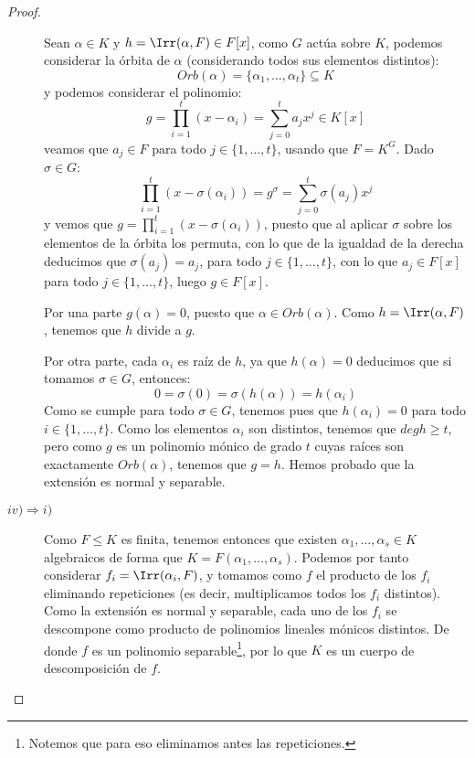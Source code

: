 \begin{teo}
\begin{proof}
\begin{description}
                Sean $\alpha\in K$ y $h = \Irr(\alpha,F)\in F[x]$, como $G$ actúa sobre $K$, podemos considerar la órbita de $\alpha$ (considerando todos sus elementos distintos):
                \begin{equation*}
                    Orb(\alpha) = \{\alpha_1, \ldots, \alpha_t\} \subseteq K
                \end{equation*}
                y podemos considerar el polinomio:
                \begin{equation*}
                    g = \prod_{i=1}^{t}(x-\alpha_i) = \sum_{j=0}^{t} a_j x^j \in K[x]
                \end{equation*}
                veamos que $a_j \in F$ para todo $j\in \{1,\ldots,t\}$, usando que $F=K^G$. Dado $\sigma\in G$:
                \begin{equation*}
                    \prod_{i=1}^{t} (x-\sigma(\alpha_i)) = g^\sigma = \sum_{j=0}^{t} \sigma(a_j) x^j
                \end{equation*}
                y vemos que $g = \prod\limits_{i=1}^{t}(x-\sigma(\alpha_i))$, puesto que al aplicar $\sigma$ sobre los elementos de la órbita los permuta, con lo que de la igualdad de la derecha deducimos que $\sigma(a_j) = a_j$, para todo $j\in \{1,\ldots,t\}$, con lo que $a_j\in F[x]$ para todo $j \in \{1,\ldots,t\}$, luego $g\in F[x]$.

                Por una parte $g(\alpha) = 0$, puesto que $\alpha\in Orb(\alpha)$. Como $h=\Irr(\alpha,F)$, tenemos que $h$ divide a $g$.

                Por otra parte, cada $\alpha_i$ es raíz de $h$, ya que $h(\alpha) = 0$ deducimos que si tomamos $\sigma\in G$, entonces:
                \begin{equation*}
                    0 = \sigma(0) = \sigma(h(\alpha)) = h(\alpha_i)
                \end{equation*}
                Como se cumple para todo $\sigma\in G$, tenemos pues que $h(\alpha_i) = 0$ para todo $i \in \{1,\ldots,t\}$. Como los elementos $\alpha_i$ son distintos, tenemos que $deg h \geq t$, pero como $g$ es un polinomio mónico de grado $t$ cuyas raíces son exactamente $Orb(\alpha)$, tenemos que $g=h$. Hemos probado que la extensión es normal y separable.
            \item [$iv)\Longrightarrow i)$] Como $F\leq K$ es finita, tenemos entonces que existen $\alpha_1, \ldots, \alpha_s\in K$ algebraicos de forma que $K = F(\alpha_1, \ldots, \alpha_s)$. Podemos por tanto considerar $f_i = \Irr(\alpha_i, F)$, y tomamos como $f$ el producto de los $f_i$ eliminando repeticiones (es decir, multiplicamos todos los $f_i$ distintos). Como la extensión es normal y separable, cada uno de los $f_i$ se descompone como producto de polinomios lineales mónicos distintos. De donde $f$ es un polinomio separable\footnote{Notemos que para eso eliminamos antes las repeticiones.}, por lo que $K$ es un cuerpo de descomposición de $f$.
        \end{description}
    \end{proof}
\end{teo}

